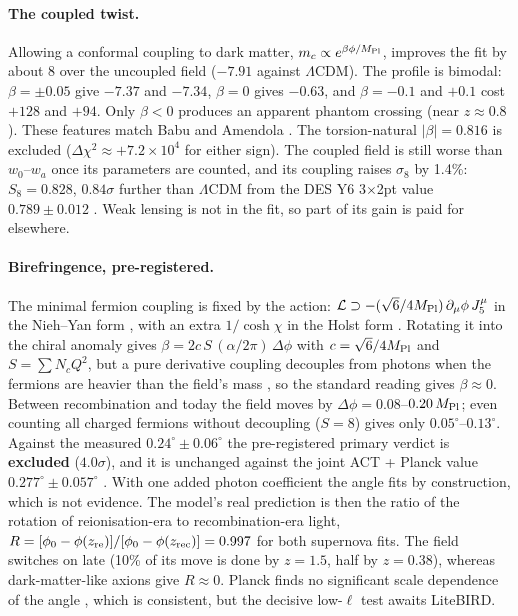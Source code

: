 \documentclass[11pt]{article}
\newcommand{\Mp}{M_{\rm Pl}}
\begin{document}
\paragraph{The coupled twist.} Allowing a conformal coupling to dark matter, $m_c\propto e^{\beta\phi/\Mp}$, improves
the fit by about 8 over the uncoupled field ($-7.91$ against $\Lambda$CDM). The profile is bimodal: $\beta=\pm0.05$
give $-7.37$ and $-7.34$, $\beta=0$ gives $-0.63$, and $\beta=-0.1$ and $+0.1$ cost $+128$ and $+94$. Only $\beta<0$
produces an apparent phantom crossing (near $z\approx0.8$). These features match Babu and Amendola \cite{babu2026}.
The torsion-natural $|\beta|=0.816$ is excluded ($\Delta\chi^2\approx+7.2\times10^4$ for either sign). The coupled
field is still worse than $w_0$--$w_a$ once its parameters are counted, and its coupling raises $\sigma_8$ by 1.4\%:
$S_8=0.828$, $0.84\sigma$ further than $\Lambda$CDM from the DES Y6 3$\times$2pt value $0.789\pm0.012$
\cite{desy6}. Weak lensing is not in the fit, so part of its gain is paid for elsewhere.

\paragraph{Birefringence, pre-registered.} The minimal fermion coupling is fixed by the action:
$\mathcal L\supset-(\sqrt6/4\Mp)\,\partial_\mu\phi\,J_5^\mu$ in the Nieh--Yan form \cite{mercuri2009}, with an extra
$1/\cosh\chi$ in the Holst form \cite{torresgomez2009}. Rotating it into the chiral anomaly gives
$\beta=2c\,S\,(\alpha/2\pi)\,\Delta\phi$ with $c=\sqrt6/4\Mp$ and $S=\sum N_cQ^2$, but a pure derivative coupling
decouples from photons when the fermions are heavier than the field's mass \cite{bauer2017}, so the standard reading
gives $\beta\approx0$. Between recombination and today the field moves by $\Delta\phi=0.08$--$0.20\,\Mp$; even counting
all charged fermions without decoupling ($S=8$) gives only $0.05^\circ$--$0.13^\circ$. Against the measured
$0.24^\circ\pm0.06^\circ$ the pre-registered primary verdict is \textbf{excluded} ($4.0\sigma$), and it is unchanged
against the joint ACT + Planck value $0.277^\circ\pm0.057^\circ$ \cite{eskilt2026}. With one added photon coefficient
the angle fits by construction, which is not evidence. The model's real prediction is then the ratio of the rotation
of reionisation-era to recombination-era light, $R=[\phi_0-\phi(z_{\rm re})]/[\phi_0-\phi(z_{\rm rec})]=0.997$ for
both supernova fits. The field switches on late (10\% of its move is done by $z=1.5$, half by $z=0.38$), whereas
dark-matter-like axions give $R\approx0$. Planck finds no significant scale dependence of the angle
\cite{ballardini2025}, which is consistent, but the decisive low-$\ell$ test awaits LiteBIRD.
\end{document}
